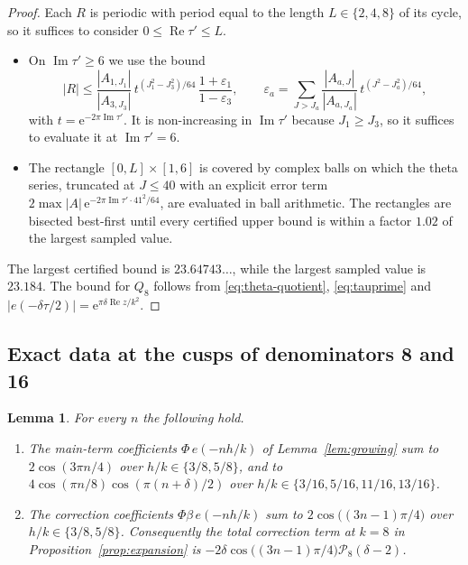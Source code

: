\documentclass[11pt]{amsart}
\newtheorem{lemma}[theorem]{Lemma}
\theoremstyle{remark}
\theoremstyle{definition}
\newcommand{\cP}{\mathcal P}
\newcommand{\Rea}{\operatorname{Re}}
\newcommand{\Ima}{\operatorname{Im}}
\newcommand{\e}{\mathrm e}
\begin{document}
\begin{proof}
Each $R$ is periodic with period equal to the length $L\in\{2,4,8\}$ of its cycle, so it suffices to consider $0\le\Rea\tau'\le L$.
\begin{itemize}[leftmargin=2em]
\item On $\Ima\tau'\ge6$ we use the bound
\[
|R|\le\frac{|A_{1,J_1}|}{|A_{3,J_3}|}\,t^{(J_1^2-J_3^2)/64}\,\frac{1+\varepsilon_1}{1-\varepsilon_3},\qquad \varepsilon_a=\sum_{J>J_a}\frac{|A_{a,J}|}{|A_{a,J_a}|}\,t^{(J^2-J_a^2)/64},
\]
with $t=\e^{-2\pi\Ima\tau'}$. It is non-increasing in $\Ima\tau'$ because $J_1\ge J_3$, so it suffices to evaluate it at $\Ima\tau'=6$.
\item The rectangle $[0,L]\times[1,6]$ is covered by complex balls on which the theta series, truncated at $J\le40$ with an explicit error term $2\max|A|\,\e^{-2\pi\Ima\tau'\cdot41^2/64}$, are evaluated in ball arithmetic. The rectangles are bisected best-first until every certified upper bound is within a factor $1.02$ of the largest sampled value.
\end{itemize}
The largest certified bound is $23.64743\ldots$, while the largest sampled value is $23.184$. The bound for $Q_8$ follows from \eqref{eq:theta-quotient}, \eqref{eq:tauprime} and $|e(-\delta\tau/2)|=\e^{\pi\delta\Rea z/k^2}$.
\end{proof}

\subsection{Exact data at the cusps of denominators 8 and 16}

\begin{lemma}\label{lem:exact}
For every $n$ the following hold.
\begin{enumerate}[label=(\roman*),leftmargin=2em]
\item The main-term coefficients $\Phi\,e(-nh/k)$ of Lemma~\ref{lem:growing} sum to $2\cos(3\pi n/4)$ over $h/k\in\{3/8,5/8\}$, and to $4\cos(\pi n/8)\cos(\pi(n+\delta)/2)$ over $h/k\in\{3/16,5/16,11/16,13/16\}$.
\item The correction coefficients $\Phi\beta\,e(-nh/k)$ sum to $2\cos\big((3n-1)\pi/4\big)$ over $h/k\in\{3/8,5/8\}$. Consequently the total correction term at $k=8$ in Proposition~\ref{prop:expansion} is $-2\delta\cos\big((3n-1)\pi/4\big)\cP_8(\delta-2)$.
\end{enumerate}
\end{lemma}
\end{document}
